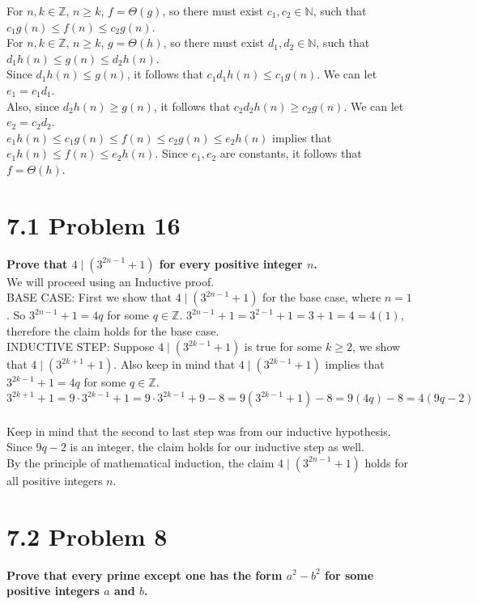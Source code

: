 \documentclass[10pt]{article}
\begin{document}
For $n,k \in \mathbb{Z}$, $n \geq k$, $f = \Theta(g)$, so there must exist $c_1, c_2 \in \mathbb{N}$, such that $c_1g(n) \leq f(n) \leq c_2g(n)$. \\

For $n,k \in \mathbb{Z}$, $n \geq k$, $g = \Theta(h)$, so there must exist $d_1, d_2 \in \mathbb{N}$, such that $d_1h(n) \leq g(n) \leq d_2h(n)$. \\

Since $d_1h(n) \leq g(n)$, it follows that $c_1d_1h(n) \leq c_1g(n)$.  We can let $e_1 = c_1d_1$. \\
Also, since $d_2h(n) \geq g(n)$, it follows that $c_2d_2h(n) \geq c_2g(n)$.  We can let $e_2 = c_2d_2$. \\

$e_1h(n) \leq c_1g(n) \leq f(n) \leq c_2g(n) \leq e_2h(n)$ implies that $e_1h(n) \leq f(n) \leq e_2h(n)$.  Since $e_1, e_2$ are constants, it follows that
$f = \Theta(h)$. \\


\section{7.1 Problem 16}
\textbf{Prove that $4 \mid (3^{2n-1} + 1)$ for every positive integer $n$.} \\
We will proceed using an Inductive proof. \\

BASE CASE: First we show that $4 \mid (3^{2n-1} + 1)$ for the base case, where $n = 1$.  So $3^{2n-1} + 1 = 4q$ for some $q \in \mathbb{Z}$.  
$3^{2n-1} + 1 = 3^{2-1} + 1 = 3 + 1 = 4 = 4(1)$, therefore the claim holds for the base case. \\

INDUCTIVE STEP: Suppose $4 \mid (3^{2k-1} + 1)$ is true for some $k \geq 2$, we show that $4 \mid (3^{2k+1} + 1)$.  Also keep in mind that $4 \mid (3^{2k-1} + 1)$
implies that $3^{2k-1} + 1 = 4q$ for some $q \in \mathbb{Z}$.
$$3^{2k+1} + 1 = 9 \cdot 3^{2k-1} + 1 = 9 \cdot 3^{2k-1} + 9 - 8 = 9(3^{2k-1} + 1) - 8 = 9(4q) - 8 = 4(9q - 2)$$ \\
Keep in mind that the second to last step was from our inductive hypothesis.  Since $9q - 2$ is an integer, the claim holds for our inductive step as well. \\

By the principle of mathematical induction, the claim $4 \mid (3^{2n-1} + 1)$ holds for all positive integers $n$.


\section{7.2 Problem 8}
\textbf{Prove that every prime except one has the form $a^2 - b^2$ for some positive integers $a$ and $b$.} \\
\end{document}
